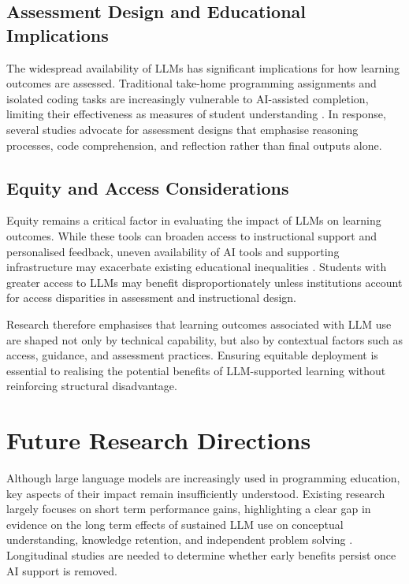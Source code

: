 \documentclass[10pt,journal,compsoc]{IEEEtran}
\begin{document}
\subsection{Assessment Design and Educational Implications}

The widespread availability of LLMs has significant implications for how learning outcomes are assessed. Traditional take-home programming assignments and isolated coding tasks are increasingly vulnerable to AI-assisted completion, limiting their effectiveness as measures of student understanding \cite{app14104115}. In response, several studies advocate for assessment designs that emphasise reasoning processes, code comprehension, and reflection rather than final outputs alone.


\subsection{Equity and Access Considerations}

Equity remains a critical factor in evaluating the impact of LLMs on learning outcomes. While these tools can broaden access to instructional support and personalised feedback, uneven availability of AI tools and supporting infrastructure may exacerbate existing educational inequalities \cite{katona_ai-based_2025}. Students with greater access to LLMs may benefit disproportionately unless institutions account for access disparities in assessment and instructional design.

Research therefore emphasises that learning outcomes associated with LLM use are shaped not only by technical capability, but also by contextual factors such as access, guidance, and assessment practices. Ensuring equitable deployment is essential to realising the potential benefits of LLM-supported learning without reinforcing structural disadvantage.


\section{Future Research Directions}
\label{sec:future}

Although large language models are increasingly used in programming education, key aspects of their impact remain insufficiently understood. Existing research largely focuses on short term performance gains, highlighting a clear gap in evidence on the long term effects of sustained LLM use on conceptual understanding, knowledge retention, and independent problem solving \cite{app14104115, Jacobs_2024}. Longitudinal studies are needed to determine whether early benefits persist once AI support is removed.
\end{document}
